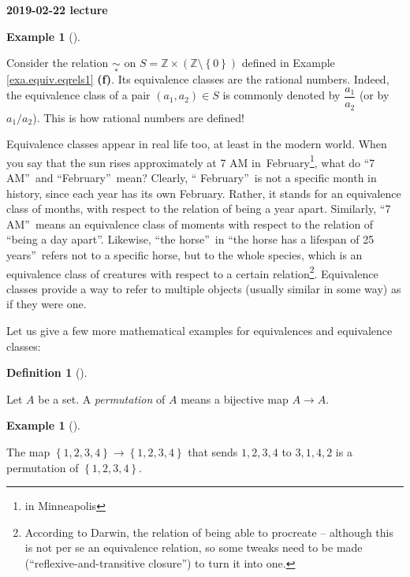\documentclass[numbers=enddot,12pt,final,onecolumn,notitlepage]{scrartcl}%
\numberwithin{exer}{subsection}
\theoremstyle{definition}
\newtheorem{defi}[theo]{Definition}
\newenvironment{definition}[1][]
{\begin{defi}[#1]\begin{leftbar}}
{\end{leftbar}\end{defi}}
\newtheorem{exam}[theo]{Example}
\newenvironment{example}[1][]
{\begin{exam}[#1]\begin{leftbar}}
{\end{leftbar}\end{exam}}
\begin{document}
\begin{center}
\textbf{2019-02-22 lecture}
\end{center}

\begin{example}
Consider the relation $\underset{\ast}{\sim}$ on $S=\mathbb{Z}\times\left(
\mathbb{Z}\setminus\left\{  0\right\}  \right)  $ defined in Example
\ref{exa.equiv.eqrels1} \textbf{(f)}. Its equivalence classes are the rational
numbers. Indeed, the equivalence class of a pair $\left(  a_{1},a_{2}\right)
\in S$ is commonly denoted by $\dfrac{a_{1}}{a_{2}}$ (or by $a_{1}/a_{2}$).
This is how rational numbers are defined!
\end{example}

Equivalence classes appear in real life too, at least in the modern world.
When you say that the sun rises approximately at 7 AM in\ February\footnote{in
Minneapolis}, what do \textquotedblleft7 AM\textquotedblright\ and
\textquotedblleft February\textquotedblright\ mean? Clearly, \textquotedblleft
February\textquotedblright\ is not a specific month in history, since each
year has its own February. Rather, it stands for an equivalence class of
months, with respect to the relation of being a year apart. Similarly,
\textquotedblleft7 AM\textquotedblright\ means an equivalence class of moments
with respect to the relation of \textquotedblleft being a day
apart\textquotedblright. Likewise, \textquotedblleft the
horse\textquotedblright\ in \textquotedblleft the horse has a lifespan of 25
years\textquotedblright\ refers not to a specific horse, but to the whole
species, which is an equivalence class of creatures with respect to a certain
relation\footnote{According to Darwin, the relation of being able to procreate
-- although this is not per se an equivalence relation, so some tweaks need to
be made (\textquotedblleft reflexive-and-transitive closure\textquotedblright)
to turn it into one.}. Equivalence classes provide a way to refer to multiple
objects (usually similar in some way) as if they were one.

Let us give a few more mathematical examples for equivalences and equivalence classes:

\begin{definition}
Let $A$ be a set. A \textit{permutation} of $A$ means a bijective map
$A\rightarrow A$.
\end{definition}

\begin{example}
The map $\left\{  1,2,3,4\right\}  \rightarrow\left\{  1,2,3,4\right\}  $ that
sends $1,2,3,4$ to $3,1,4,2$ is a permutation of $\left\{  1,2,3,4\right\}  $.
\end{example}
\end{document}

